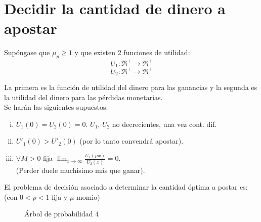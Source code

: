  \section{Decidir la cantidad de dinero a apostar}
 \label{sec:cantidad-apostar}

 Supóngase que $\mu_p \ge 1$ y que existen 2 funciones de utilidad:
 \[U_1:\Re^+ \rightarrow \Re^+\]
 \[U_2:\Re^+ \rightarrow \Re^+\]

 La primera es la función de utilidad del dinero para las ganancias y la segunda es la utilidad del dinero para las pérdidas monetarias.\\

 Se harán las siguientes supuestos:

 \begin{enumerate}[(i)]
  \item $U_1(0)=U_2(0)=0$. $U_1$, $U_2$ no decrecientes, una vez cont. dif.
  \item $U'_1(0)>U'_2(0)$ (por lo tanto convendrá apostar).
  \item $\forall M>0$ fija $\displaystyle \lim_{x\rightarrow \infty} \frac{U_1(\mu x)}{U_2(x)}=0$.\\
  (Perder duele muchisimo más que ganar).
 \end{enumerate}
 El problema de decisión asociado a  determinar la cantidad óptima a postar es:(con $0<p<1$ fija y $\mu$ momio)\\

 \begin{figure}[ht]
  \begin{center}
 \end{center}
 \caption{Árbol de probabilidad 4}
 \end{figure}



